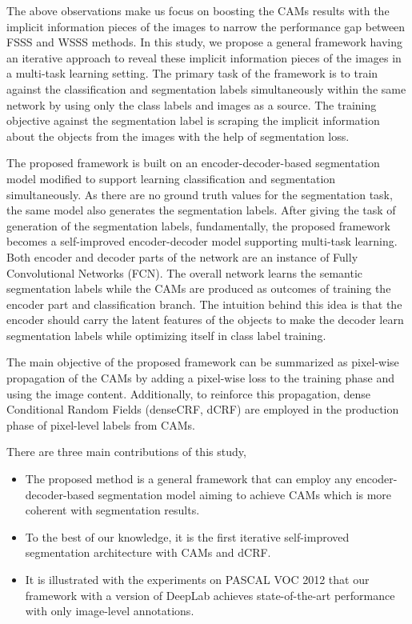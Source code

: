 \documentclass[sn-mathphys]{sn-jnl}
\theoremstyle{thmstyleone}
\theoremstyle{thmstyletwo}\newtheorem{example}{Example}\newtheorem{remark}{Remark}
\theoremstyle{thmstylethree}\newtheorem{definition}{Definition}
\begin{document}
The above observations make us focus on boosting the CAMs results with the implicit information pieces of the images to narrow the performance gap between FSSS and WSSS methods. In this study, we propose a general framework having an iterative approach to reveal these implicit information pieces of the images in a multi-task learning setting. The primary task of the framework is to train against the classification and segmentation labels simultaneously within the same network by using only the class labels and images as a source. The training objective against the segmentation label is scraping the implicit information about the objects from the images with the help of segmentation loss.

The proposed framework is built on an encoder-decoder-based segmentation model modified to support learning classification and segmentation simultaneously. As there are no ground truth values for the segmentation task, the same model also generates the segmentation labels. After giving the task of generation of the segmentation labels, fundamentally, the proposed framework becomes a self-improved encoder-decoder model supporting multi-task learning. Both encoder and decoder parts of the network are an instance of Fully Convolutional Networks (FCN). The overall network learns the semantic segmentation labels while the CAMs are produced as outcomes of training the encoder part and classification branch. The intuition behind this idea is that the encoder should carry the latent features of the objects to make the decoder learn segmentation labels while optimizing itself in class label training. 

The main objective of the proposed framework can be summarized as pixel-wise propagation of the CAMs by adding a pixel-wise loss to the training phase and using the image content. Additionally, to reinforce this propagation, dense Conditional Random Fields (denseCRF, dCRF) are employed in the production phase of pixel-level labels from CAMs.

There are three main contributions of this study, 
\begin{itemize}
    \item The proposed method is a general framework that can employ any encoder-decoder-based segmentation model aiming to achieve CAMs which is more coherent with segmentation results.
    \item To the best of our knowledge, it is the first iterative self-improved segmentation architecture with CAMs and dCRF.
    \item It is illustrated with the experiments on PASCAL VOC 2012 that our framework with a version of DeepLab achieves state-of-the-art performance with only image-level annotations.
\end{itemize}
\end{document}
